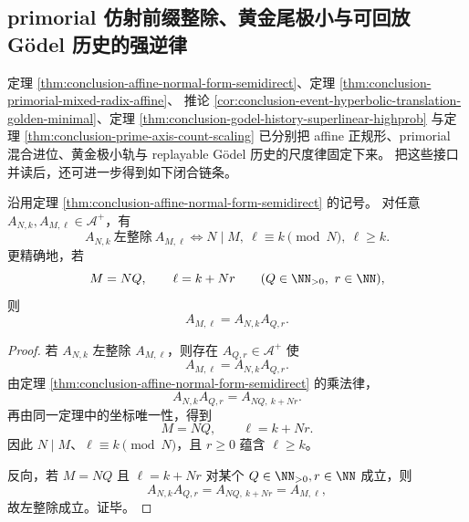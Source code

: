 \subsection{primorial 仿射前缀整除、黄金尾极小与可回放 Gödel 历史的强逆律}\label{subsec:conclusion-primorial-prefix-golden-tail-replay-strongconverse}
定理 \ref{thm:conclusion-affine-normal-form-semidirect}、定理 \ref{thm:conclusion-primorial-mixed-radix-affine}、
推论 \ref{cor:conclusion-event-hyperbolic-translation-golden-minimal}、定理 \ref{thm:conclusion-godel-history-superlinear-highprob}
与定理 \ref{thm:conclusion-prime-axis-count-scaling} 已分别把 affine 正规形、primorial 混合进位、黄金极小轨与 replayable Gödel 历史的尺度律固定下来。
把这些接口并读后，还可进一步得到如下闭合链条。

\begin{theorem}[仿射正规形单体的左整除判据]\label{thm:conclusion-affine-left-divisibility-criterion}
沿用定理 \ref{thm:conclusion-affine-normal-form-semidirect} 的记号。
对任意 \(A_{N,k},A_{M,\ell}\in \mathcal A^{+}\)，有
\[
A_{N,k}\ \text{左整除}\ A_{M,\ell}
\iff
N\mid M,\ \ell\equiv k\pmod N,\ \ell\ge k.
\]
更精确地，若
\[
M=NQ,\qquad \ell=k+Nr
\qquad(Q\in\NN_{>0},\ r\in\NN),
\]
则
\[
A_{M,\ell}=A_{N,k}A_{Q,r}.
\]
\end{theorem}
\begin{proof}
若 \(A_{N,k}\) 左整除 \(A_{M,\ell}\)，则存在 \(A_{Q,r}\in\mathcal A^{+}\) 使
\[
A_{M,\ell}=A_{N,k}A_{Q,r}.
\]
由定理 \ref{thm:conclusion-affine-normal-form-semidirect} 的乘法律，
\[
A_{N,k}A_{Q,r}=A_{NQ,\ k+Nr}.
\]
再由同一定理中的坐标唯一性，得到
\[
M=NQ,\qquad \ell=k+Nr.
\]
因此 \(N\mid M\)、\(\ell\equiv k\pmod N\)，且 \(r\ge 0\) 蕴含 \(\ell\ge k\)。

反向，若 \(M=NQ\) 且 \(\ell=k+Nr\) 对某个 \(Q\in\NN_{>0},r\in\NN\) 成立，则
\[
A_{N,k}A_{Q,r}=A_{NQ,\ k+Nr}=A_{M,\ell},
\]
故左整除成立。证毕。
\end{proof}

